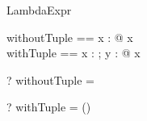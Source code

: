 \begin{zsection}
  \SECTION LambdaExpr
\end{zsection}

\begin{zed}
  withoutTuple == \lambda x : \nat @ x\\
  withTuple == \lambda x : \nat; y : \power \nat @ x
\end{zed}

\begin{zed} \vdash? withoutTuple = \nat \cross \nat \end{zed}
\begin{zed}
 \vdash? withTuple = (\nat \cross \power \nat) \cross \nat 
\end{zed}
